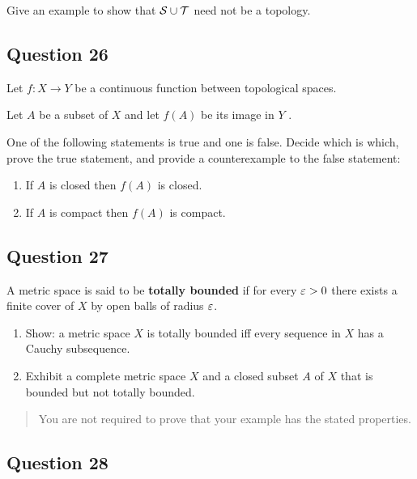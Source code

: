 \documentclass[12pt]{article}
\begin{document}
Give an example to show that \({\mathcal{S}} \cup {\mathcal{T}}\) need not be a topology.

\hypertarget{question-26-3}{%
\subsection{Question 26}\label{question-26-3}}

Let \(f : X \to Y\) be a continuous function between topological spaces.

Let \(A\) be a subset of \(X\) and let \(f (A)\) be its image in \(Y\) .

One of the following statements is true and one is false. Decide which
is which, prove the true statement, and provide a counterexample to the
false statement:

\begin{enumerate}
\def\labelenumi{\arabic{enumi}.}
\item
  If \(A\) is closed then \(f (A)\) is closed.
\item
  If \(A\) is compact then \(f (A)\) is compact.
\end{enumerate}

\hypertarget{question-27-3}{%
\subsection{Question 27}\label{question-27-3}}

A metric space is said to be \textbf{totally bounded} if for every
\(\varepsilon > 0\) there exists a finite cover of \(X\) by open balls of
radius \(\varepsilon\).

\begin{enumerate}
\def\labelenumi{\alph{enumi}.}
\item
  Show: a metric space \(X\) is totally bounded iff every sequence in
  \(X\) has a Cauchy subsequence.
\item
  Exhibit a complete metric space \(X\) and a closed subset \(A\) of
  \(X\) that is bounded but not totally bounded.
\end{enumerate}

\begin{quote}
You are not required to prove that your example has the stated
properties.
\end{quote}

\hypertarget{question-28-3}{%
\subsection{Question 28}\label{question-28-3}}
\end{document}
